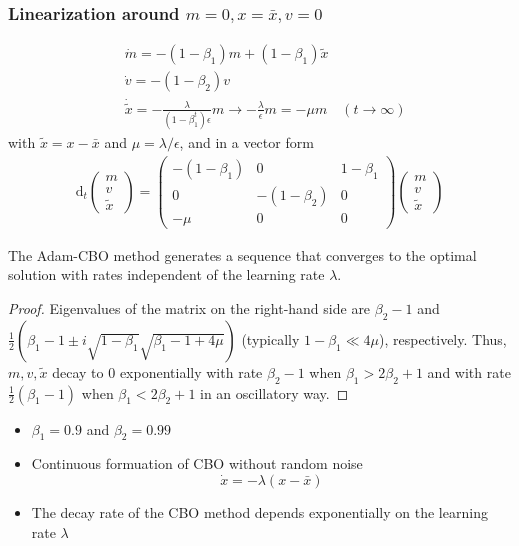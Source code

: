 \documentclass[aspectratio=169]{beamer}
\begin{document}
\begin{frame}
\frametitle{Linearization around $m = 0, x = \bar{x}, v = 0 $}
	\begin{align*}	
	&\dot m = -(1-\beta_1) m + (1-\beta_1) \tilde{x}\\
	&\dot v = -(1-\beta_2)v \\
	&\dot {\tilde{x}} = -\frac{\lambda }{(1-\beta_1^t)\epsilon}m \rightarrow -\frac{\lambda}{\epsilon} m = -\mu m  \quad (t \rightarrow \infty)
	\end{align*}
	with $\tilde{x} = x - \bar{x}$ and $\mu=\lambda/\epsilon$, and in a vector form
	\begin{equation*}
	\begin{aligned}
	\mathrm{d}_t	\left(\begin{matrix}
			m \\ v \\ \tilde x
		\end{matrix}\right) = 
	\left(\begin{matrix}
		-(1-\beta_1) & 0 & 1-\beta_1\\ 
		0 &  -(1-\beta_2) & 0  \\
		 -\mu & 0 & 0  
	\end{matrix}\right) 
	\left(\begin{matrix}
	m \\ v \\ \tilde x
	\end{matrix}\right)
	\end{aligned}
	\end{equation*}
\end{frame}

\begin{frame}
\begin{theorem}
	The Adam-CBO method generates a sequence that converges to the optimal solution with rates independent of the learning rate $\lambda$. 
	\begin{proof}
	Eigenvalues of the matrix on the right-hand side are $\beta_2-1$ and $\frac{1}{2}( \beta_1 - 1 \pm i  \sqrt{1-\beta_1}\sqrt{\beta_1-1+4\mu})$ (typically $1-\beta_1\ll 4\mu$), respectively. Thus, $m,v,\tilde{x}$ decay to $0$  exponentially with rate $\beta_2 -1 $ when $\beta_1>2\beta_2+1$ and with rate $\frac{1}{2}(\beta_1-1)$ when $\beta_1 < 2 \beta_2 + 1$ in an oscillatory way. 
	\end{proof}
\end{theorem} 	

\begin{itemize}
	\item $\beta_1 = 0.9$ and $\beta_2 = 0.99$
	\item Continuous formuation of CBO without random noise
	\begin{equation*}
	\dot x = - \lambda (x- \bar{x})
	\end{equation*}
	\item The decay rate of the CBO method depends exponentially on the learning rate $\lambda$
\end{itemize}

\end{frame}
\end{document}
